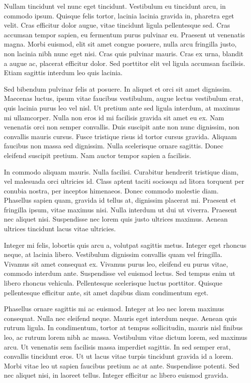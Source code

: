 \documentclass[pdftex, brazil, 12pt, twoside]{article}
\begin{document}
Nullam tincidunt vel nunc eget tincidunt. Vestibulum eu tincidunt arcu, in commodo ipsum. Quisque felis tortor, lacinia lacinia gravida in, pharetra eget velit. Cras efficitur dolor augue, vitae tincidunt ligula pellentesque sed. Cras accumsan tempor sapien, eu fermentum purus pulvinar eu. Praesent ut venenatis magna. Morbi euismod, elit sit amet congue posuere, nulla arcu fringilla justo, non lacinia nibh nunc eget nisi. Cras quis pulvinar mauris. Cras ex urna, blandit a augue ac, placerat efficitur dolor. Sed porttitor elit vel ligula accumsan facilisis. Etiam sagittis interdum leo quis lacinia.

Sed bibendum pulvinar felis at posuere. In aliquet et orci sit amet dignissim. Maecenas luctus, ipsum vitae faucibus vestibulum, augue lectus vestibulum erat, quis lacinia purus leo vel nisl. Ut pretium ante sed ligula interdum, at maximus mi ullamcorper. Nulla non eros id mi facilisis gravida sit amet eu ex. Nam venenatis orci non semper convallis. Duis suscipit ante non nunc dignissim, non convallis mauris cursus. Fusce tristique risus id tortor cursus gravida. Aliquam faucibus non massa sed dignissim. Nulla scelerisque ornare sagittis. Donec eleifend suscipit pretium. Nam auctor tempor sapien a facilisis.

In commodo aliquam mauris. Nulla facilisi. Curabitur hendrerit tristique diam, vel malesuada orci ultricies id. Class aptent taciti sociosqu ad litora torquent per conubia nostra, per inceptos himenaeos. Donec commodo molestie diam. Phasellus sapien quam, gravida id tellus at, dignissim placerat mi. Praesent et fringilla ipsum, vitae maximus nisi. Nulla interdum ut dui ut viverra. Praesent nec aliquet nisi. Suspendisse nec lorem quis justo ultrices maximus. Aenean ultrices tincidunt lacus vitae ultricies.

Integer mi felis, lobortis quis arcu a, volutpat sagittis metus. Integer eget rhoncus neque, at lacinia libero. Vestibulum dignissim convallis quam vel fringilla. Vivamus sit amet consequat ex. Vivamus purus leo, eleifend eu purus vitae, commodo interdum ante. Suspendisse vel euismod lectus. Sed tempus enim ut libero rhoncus vehicula. Pellentesque scelerisque luctus porttitor. Quisque pellentesque efficitur ante, sit amet dapibus diam condimentum eget.

Phasellus ornare sagittis mi ac euismod. Integer at leo nec lorem maximus consequat. Nulla nec eleifend neque. Mauris eget interdum neque. Aenean quis rutrum ligula. In condimentum, tortor at tempus sollicitudin, mauris nisl finibus leo, ac rutrum lorem nibh ac massa. Vestibulum vitae dictum lorem, sed maximus arcu. Ut venenatis sem facilisis massa imperdiet sagittis. In sed semper erat, convallis tincidunt eros. Ut ut lacus vitae turpis tincidunt gravida id a lorem. Morbi vitae leo ut sapien faucibus pretium ac at ante. Suspendisse potenti. Sed nec aliquet nisi, in laoreet tellus. Integer efficitur ac libero euismod gravida.
\end{document}
